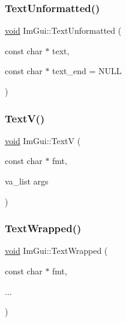 \mbox{\label{namespaceImGui_a96a5f42789ecc419b2ae8af7b2acc28e}} 
\subsubsection{\texorpdfstring{Text\+Unformatted()}{TextUnformatted()}}
{\footnotesize\ttfamily \hyperlink{imgui__impl__opengl3__loader_8h_ac668e7cffd9e2e9cfee428b9b2f34fa7}{void} Im\+Gui\+::\+Text\+Unformatted (\begin{DoxyParamCaption}\item[{const char $\ast$}]{text,  }\item[{const char $\ast$}]{text\+\_\+end = {\ttfamily NULL} }\end{DoxyParamCaption})}

\mbox{\label{namespaceImGui_a10a0d6362178c2f743092f21e1b6cd20}} 
\subsubsection{\texorpdfstring{Text\+V()}{TextV()}}
{\footnotesize\ttfamily \hyperlink{imgui__impl__opengl3__loader_8h_ac668e7cffd9e2e9cfee428b9b2f34fa7}{void} Im\+Gui\+::\+TextV (\begin{DoxyParamCaption}\item[{const char $\ast$}]{fmt,  }\item[{va\+\_\+list}]{args }\end{DoxyParamCaption})}

\mbox{\label{namespaceImGui_ad57bb15c599e73b2ccc7c0f7de6e5823}} 
\subsubsection{\texorpdfstring{Text\+Wrapped()}{TextWrapped()}}
{\footnotesize\ttfamily \hyperlink{imgui__impl__opengl3__loader_8h_ac668e7cffd9e2e9cfee428b9b2f34fa7}{void} Im\+Gui\+::\+Text\+Wrapped (\begin{DoxyParamCaption}\item[{const char $\ast$}]{fmt,  }\item[{}]{... }\end{DoxyParamCaption})}

